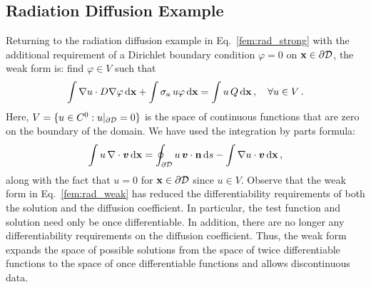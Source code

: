 \documentclass[../doc.tex]{subfiles}
\begin{document}
\subsection{Radiation Diffusion Example}
Returning to the radiation diffusion example in Eq.~\ref{fem:rad_strong} with the additional requirement of a Dirichlet boundary condition $\varphi = 0$ on $\boldsymbol{\mathrm{x}}\in\partial\mathcal{D}$, the weak form is: find $\varphi \in V$ such that 
	\begin{equation} \label{fem:rad_weak}
		\int \nabla u \cdot D \nabla\varphi \mathop{}\!\mathrm{d} \boldsymbol{\mathrm{x}} + \int \sigma_a\, u \varphi \mathop{}\!\mathrm{d} \boldsymbol{\mathrm{x}} = \int u\, Q \mathop{}\!\mathrm{d} \boldsymbol{\mathrm{x}} \,,\quad \forall u \in V \,. 
	\end{equation}
Here, $V = \{ u \in C^0 : u|_{\partial\mathcal{D}} = 0 \}$ is the space of continuous functions that are zero on the boundary of the domain. 
We have used the integration by parts formula: 
	\begin{equation}
		\int u\, \nabla\cdot\boldsymbol{v} \mathop{}\!\mathrm{d} \boldsymbol{\mathrm{x}} = \oint_{\partial\mathcal{D}} u\,\boldsymbol{v}\cdot\boldsymbol{\mathrm{n}} \mathop{}\!\mathrm{d} s - \int \nabla u \cdot \boldsymbol{v} \mathop{}\!\mathrm{d} \boldsymbol{\mathrm{x}} \,, 
	\end{equation}
along with the fact that $u = 0$ for $\boldsymbol{\mathrm{x}} \in \partial\mathcal{D}$ since $u \in V$.  
Observe that the weak form in Eq.~\ref{fem:rad_weak} has reduced the differentiability requirements of both the solution and the diffusion coefficient. In particular, the test function and solution need only be once differentiable. In addition, there are no longer any differentiability requirements on the diffusion coefficient. 
Thus, the weak form expands the space of possible solutions from the space of twice differentiable functions to the space of once differentiable functions and allows discontinuous data. 
\end{document}
